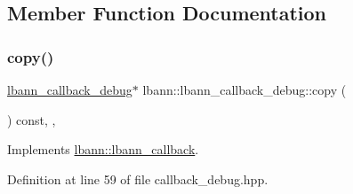 \subsection{Member Function Documentation}
\mbox{\label{classlbann_1_1lbann__callback__debug_a76ffcfb7aca5ccce132ceae60e267472}} 
\subsubsection{\texorpdfstring{copy()}{copy()}}
{\footnotesize\ttfamily \hyperlink{classlbann_1_1lbann__callback__debug}{lbann\+\_\+callback\+\_\+debug}$\ast$ lbann\+::lbann\+\_\+callback\+\_\+debug\+::copy (\begin{DoxyParamCaption}{ }\end{DoxyParamCaption}) const\hspace{0.3cm}{\ttfamily [inline]}, {\ttfamily [override]}, {\ttfamily [virtual]}}



Implements \hyperlink{classlbann_1_1lbann__callback_a9f545d1269a8c7af335625d049691f26}{lbann\+::lbann\+\_\+callback}.



Definition at line 59 of file callback\+\_\+debug.\+hpp.


